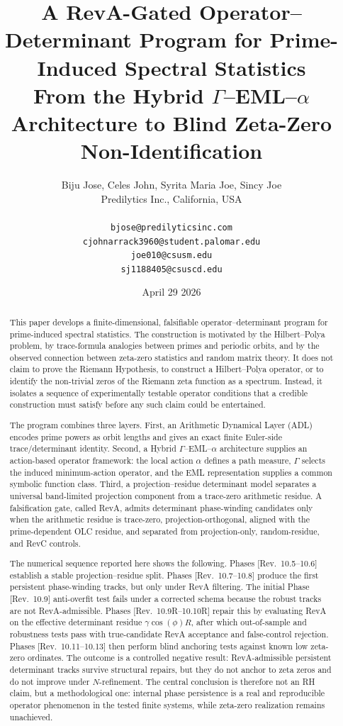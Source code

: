 \documentclass[11pt]{article}
\title{A RevA-Gated Operator--Determinant Program for Prime-Induced Spectral Statistics\\
\large From the Hybrid $\Gamma$--EML--$\alpha$ Architecture to Blind Zeta-Zero Non-Identification}
\author{
Biju Jose, Celes John, Syrita Maria Joe, Sincy Joe\\
Predilytics Inc., California, USA\\[0.4em]
{\footnotesize
\begin{tabular}{c}
\texttt{bjose@predilyticsinc.com}\\
\texttt{cjohnarrack3960@student.palomar.edu}\\
\texttt{joe010@csusm.edu}\\
\texttt{sj1188405@csuscd.edu}
\end{tabular}
}
}
\date{April 29 2026}
\newcommand{\revtag}[1]{\textnormal{[Rev.~#1]}}
\theoremstyle{definition}
\theoremstyle{plain}
\begin{document}
\maketitle

\begin{abstract}
This paper develops a finite-dimensional, falsifiable operator--determinant program for prime-induced spectral statistics.  The construction is motivated by the Hilbert--Polya problem, by trace-formula analogies between primes and periodic orbits, and by the observed connection between zeta-zero statistics and random matrix theory.  It does not claim to prove the Riemann Hypothesis, to construct a Hilbert--Polya operator, or to identify the non-trivial zeros of the Riemann zeta function as a spectrum.  Instead, it isolates a sequence of experimentally testable operator conditions that a credible construction must satisfy before any such claim could be entertained.

The program combines three layers.  First, an Arithmetic Dynamical Layer (ADL) encodes prime powers as orbit lengths and gives an exact finite Euler-side trace/determinant identity.  Second, a Hybrid $\Gamma$--EML--$\alpha$ architecture supplies an action-based operator framework: the local action $\alpha$ defines a path measure, $\Gamma$ selects the induced minimum-action operator, and the EML representation supplies a common symbolic function class.  Third, a projection--residue determinant model separates a universal band-limited projection component from a trace-zero arithmetic residue.  A falsification gate, called RevA, admits determinant phase-winding candidates only when the arithmetic residue is trace-zero, projection-orthogonal, aligned with the prime-dependent OLC residue, and separated from projection-only, random-residue, and RevC controls.

The numerical sequence reported here shows the following.  Phases \revtag{10.5--10.6} establish a stable projection--residue split.  Phases \revtag{10.7--10.8} produce the first persistent phase-winding tracks, but only under RevA filtering.  The initial Phase \revtag{10.9} anti-overfit test fails under a corrected schema because the robust tracks are not RevA-admissible.  Phases \revtag{10.9R--10.10R} repair this by evaluating RevA on the effective determinant residue $\gamma\cos(\phi)R$, after which out-of-sample and robustness tests pass with true-candidate RevA acceptance and false-control rejection.  Phases \revtag{10.11--10.13} then perform blind anchoring tests against known low zeta-zero ordinates.  The outcome is a controlled negative result: RevA-admissible persistent determinant tracks survive structural repairs, but they do not anchor to zeta zeros and do not improve under $N$-refinement.  The central conclusion is therefore not an RH claim, but a methodological one: internal phase persistence is a real and reproducible operator phenomenon in the tested finite systems, while zeta-zero realization remains unachieved.
\end{abstract}
\end{document}
